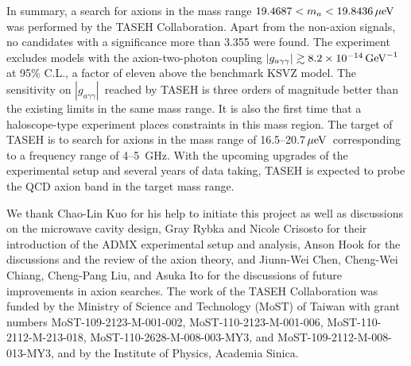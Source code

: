 \documentclass[%
 reprint,prl, %
superscriptaddress,
nobibnotes,
 amsmath,amssymb,
 aps,
]{revtex4-2}
\newcommand{\gagg}{\ensuremath{\left|g_{a\gamma\gamma}\right|}}
\newcommand{\ma}{\ensuremath{m_a}}
\newcommand{\muevcc}{\ensuremath{\,\mu\text{e\hspace{-.08em}V}}}
\newcommand{\GeVinv}{\ensuremath{\,\text{Ge\hspace{-.08em}V}^{-1}}}
\newcommand{\mlo}{\ensuremath{19.4687}}
\newcommand{\mhi}{\ensuremath{19.8436}}
\newcommand{\avelimit}{\ensuremath{8.2\times 10^{-14}}} %
\begin{document}
In summary, a search for axions in the mass 
range $\mlo < \ma < \mhi \muevcc$ was performed by the TASEH Collaboration.  
Apart from the non-axion signals, no candidates with a significance more than
3.355 were found. The experiment excludes models with the 
axion-two-photon coupling $\gagg\gtrsim \avelimit\GeVinv$ at 95\% C.L.,
 a factor of eleven 
above the benchmark KSVZ model. The sensitivity on \gagg\ reached by TASEH 
is three orders of magnitude better than the existing limits in the same 
mass range.  
It is also the first time that a haloscope-type experiment places 
constraints in this mass region. 
The target of TASEH is to search for axions in the mass range of 
16.5--20.7\muevcc\ corresponding to a frequency range of 4--5~GHz. 
With the upcoming upgrades of the experimental setup and several years of data 
taking, TASEH is expected to probe the QCD axion band in the target mass range.

\begin{acknowledgments}
We thank Chao-Lin Kuo for his help to initiate this project as well as
discussions on the microwave cavity design, Gray Rybka and Nicole Crisosto
for their introduction of the ADMX experimental
setup and analysis, Anson Hook for the discussions and the review of the
axion theory, and Jiunn-Wei Chen, Cheng-Wei Chiang, Cheng-Pang Liu, and
Asuka Ito for the discussions of future improvements in axion searches.
  The work of the TASEH Collaboration was funded by
the Ministry of Science and Technology (MoST) of Taiwan with grant numbers
MoST-109-2123-M-001-002, MoST-110-2123-M-001-006, MoST-110-2112-M-213-018,
MoST-110-2628-M-008-003-MY3,
and MoST-109-2112-M-008-013-MY3, and by the Institute of Physics, Academia
Sinica.
\end{acknowledgments}

\end{document}
